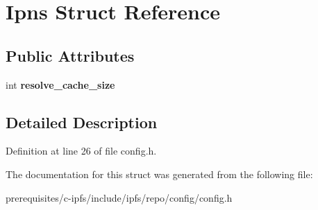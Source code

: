 \hypertarget{struct_ipns}{}\section{Ipns Struct Reference}
\label{struct_ipns}
\subsection*{Public Attributes}
\begin{DoxyCompactItemize}
\item 
\mbox{\label{struct_ipns_abd5dbec5afbc16974a6e9ede4a5c4e25}} 
int {\bfseries resolve\+\_\+cache\+\_\+size}
\end{DoxyCompactItemize}


\subsection{Detailed Description}


Definition at line 26 of file config.\+h.



The documentation for this struct was generated from the following file\+:\begin{DoxyCompactItemize}
\item 
prerequisites/c-\/ipfs/include/ipfs/repo/config/config.\+h\end{DoxyCompactItemize}
